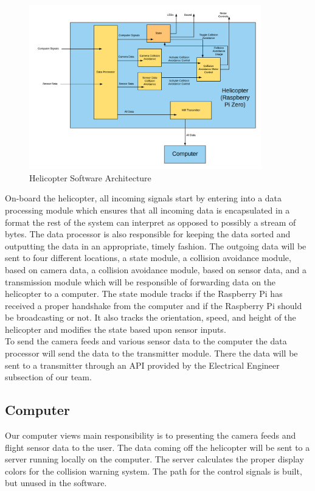 \documentclass[onecolumn, oneside, letterpaper, draftclsnofoot, 10pt, compsoc]{IEEEtran}
\begin{document}
\begin{figure}[h]
    \centering
    \includegraphics[width=0.9\textwidth]{graphics/helicopter_diagram.png}
    \caption{Helicopter Software Architecture}
    \label{fig:HelicopterSoftwareArchitecture}
\end{figure}

On-board the helicopter, all incoming signals start by entering into a data processing module which ensures that all incoming data is encapsulated in a format the rest of the system can interpret as opposed to possibly a stream of bytes. The data processor is also responsible for keeping the data sorted and outputting the data in an appropriate, timely fashion. The outgoing data will be sent to four different locations, a state module, a collision avoidance module, based on camera data, a collision avoidance module, based on sensor data, and a transmission module which will be responsible of forwarding data on the helicopter to a computer. The state module tracks if the Raspberry Pi has received a proper handshake from the computer and if the Raspberry Pi should be broadcasting or not. It also tracks the orientation, speed, and height of the helicopter and modifies the state based upon sensor inputs.\\

To send the camera feeds and various sensor data to the computer the data processor will send the data to the transmitter module. There the data will be sent to a transmitter through an API provided by the Electrical Engineer subsection of our team.

\subsection{Computer}
Our computer view\textquotesingle s main responsibility is to presenting the camera feeds and flight sensor data to the user. The data coming off the helicopter will be sent to a server running locally on the computer. The server calculates the proper display colors for the collision warning system. The path for the control signals is built, but unused in the software.
\end{document}
